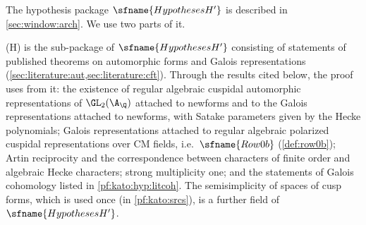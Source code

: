 The hypothesis package $\sfname{HypothesesH'}$ is described in \cref{sec:window:arch}. We use two parts of it.

\begin{hypothesis}\label{pf:kato:hyp:aut}
\textup{(H)} is the sub-package of $\sfname{HypothesesH'}$ consisting of statements of published theorems on
automorphic forms and Galois representations (\cref{sec:literature:aut,sec:literature:cft}). Through the results
cited below, the proof uses from it: the existence of regular algebraic cuspidal automorphic representations of
$\GL_2(\A_\Q)$ attached to newforms and to the Galois representations attached to newforms, with Satake parameters
given by the Hecke polynomials; Galois representations attached to regular algebraic polarized cuspidal
representations over CM fields, i.e.\ $\sfname{Row0b}$ (\cref{def:row0b}); Artin reciprocity and the
correspondence between characters of finite order and algebraic Hecke characters; strong multiplicity one; and
the statements of Galois cohomology listed in \cref{pf:kato:hyp:litcoh}. The semisimplicity of spaces of cusp
forms, which is used once (in \cref{pf:kato:srcs}), is a further field of $\sfname{HypothesesH'}$.
\end{hypothesis}

